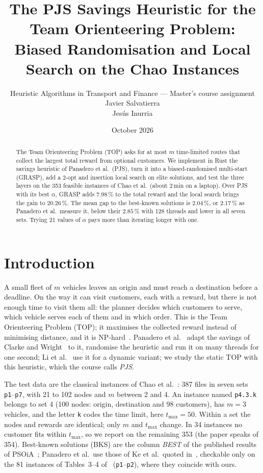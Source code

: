 \documentclass[10pt,a4paper]{article}
\title{\vspace{-1.2cm}\bfseries The PJS Savings Heuristic for the Team Orienteering Problem:\\
Biased Randomisation and Local Search on the Chao Instances}
\author{Heuristic Algorithms in Transport and Finance --- Master's course assignment \\
    Javier Salvatierra \\
    Jesús Inurria
}
\date{October 2026}
\begin{document}
\maketitle
\vspace{-0.8cm}

\begin{abstract}
\noindent\small
The Team Orienteering Problem (TOP) asks for at most $m$ time-limited routes that collect the largest
total reward from optional customers. We implement in Rust the savings heuristic of Panadero et al.\
(PJS), turn it into a biased-randomised multi-start (GRASP), add a 2-opt and insertion local search on
elite solutions, and test the three layers on the 353 feasible instances of Chao et al.\ (about 2\,min
on a laptop). Over PJS with its best $\alpha$, GRASP adds $7.98\,\%$ to the total reward and
the local search brings the gain to $20.26\,\%$. The mean gap to the best-known solutions is
$2.04\,\%$, or $2.17\,\%$ as Panadero et al.\ measure it, below their $2.85\,\%$ with 128 threads and lower in all seven sets.
Trying 21 values of $\alpha$ pays more than iterating longer with one.
\end{abstract}

\section{Introduction}

A small fleet of $m$ vehicles leaves an origin and must reach a destination before a deadline. On the
way it can visit customers, each with a reward, but there is not enough time to visit them all: the
planner decides which customers to serve, which vehicle serves each of them and in which order. This is the Team
Orienteering Problem (TOP); it maximises the
collected reward instead of minimising distance, and it is NP-hard~\cite{panadero2021}. Panadero et
al.~\cite{panadero2021} adapt the savings of Clarke and Wright~\cite{cw1964} to it, randomise the
heuristic and run it on many threads for one second; Li et al.~\cite{li2022} use it for a dynamic
variant; we study the static TOP with this heuristic, which the course calls \emph{PJS}.

The test data are the classical instances of Chao et al.~\cite{chao1996}: 387 files in seven sets
\texttt{p1}--\texttt{p7}, with 21 to 102 nodes and $m$ between 2 and 4. An instance named
\texttt{p4.3.k} belongs to set 4 (100 nodes: origin, destination and 98 customers), has $m=3$ vehicles,
and the letter \texttt{k} codes the time limit, here $t_{\max}=50$. Within a set the nodes and rewards
are identical; only $m$ and $t_{\max}$ change. In 34 instances no customer fits within $t_{\max}$, so we report on the remaining 353
(the paper speaks of 354). Best-known solutions (BKS) are the column \emph{BEST} of the published results
of PSOiA~\cite{dang2013}; Panadero et al.\ use those of Ke et al.\ quoted in~\cite{panadero2021}, checkable only on the 81
instances of Tables~3--4 of~\cite{panadero2021} (\texttt{p1}--\texttt{p2}), where they coincide with ours.
\end{document}
